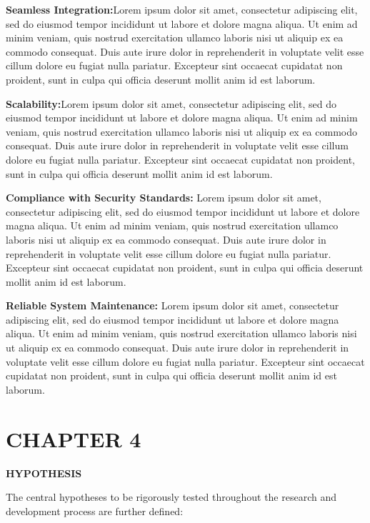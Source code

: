 \documentclass[12pt]{article}
\newcommand{\centersection}[1]{%
  \begin{center}
    \fontfamily{ptm}\fontsize{14}{16}\selectfont\bfseries\uppercase{#1}
  \end{center}
}
\begin{document}
\textbf{Seamless Integration:}Lorem ipsum dolor sit amet, consectetur adipiscing elit, sed do eiusmod tempor incididunt ut labore et dolore magna aliqua. Ut enim ad minim veniam, quis nostrud exercitation ullamco laboris nisi ut aliquip ex ea commodo consequat. Duis aute irure dolor in reprehenderit in voluptate velit esse cillum dolore eu fugiat nulla pariatur. Excepteur sint occaecat cupidatat non proident, sunt in culpa qui officia deserunt mollit anim id est laborum.

\textbf{Scalability:}Lorem ipsum dolor sit amet, consectetur adipiscing elit, sed do eiusmod tempor incididunt ut labore et dolore magna aliqua. Ut enim ad minim veniam, quis nostrud exercitation ullamco laboris nisi ut aliquip ex ea commodo consequat. Duis aute irure dolor in reprehenderit in voluptate velit esse cillum dolore eu fugiat nulla pariatur. Excepteur sint occaecat cupidatat non proident, sunt in culpa qui officia deserunt mollit anim id est laborum.

\textbf{Compliance with Security Standards:} Lorem ipsum dolor sit amet, consectetur adipiscing elit, sed do eiusmod tempor incididunt ut labore et dolore magna aliqua. Ut enim ad minim veniam, quis nostrud exercitation ullamco laboris nisi ut aliquip ex ea commodo consequat. Duis aute irure dolor in reprehenderit in voluptate velit esse cillum dolore eu fugiat nulla pariatur. Excepteur sint occaecat cupidatat non proident, sunt in culpa qui officia deserunt mollit anim id est laborum.

\textbf{Reliable System Maintenance:} Lorem ipsum dolor sit amet, consectetur adipiscing elit, sed do eiusmod tempor incididunt ut labore et dolore magna aliqua. Ut enim ad minim veniam, quis nostrud exercitation ullamco laboris nisi ut aliquip ex ea commodo consequat. Duis aute irure dolor in reprehenderit in voluptate velit esse cillum dolore eu fugiat nulla pariatur. Excepteur sint occaecat cupidatat non proident, sunt in culpa qui officia deserunt mollit anim id est laborum.
\section*{CHAPTER 4}
\centersection{HYPOTHESIS}
\fontsize{12}{14}\selectfont
The central hypotheses to be rigorously tested throughout the research and development process are further defined:

\end{document}
